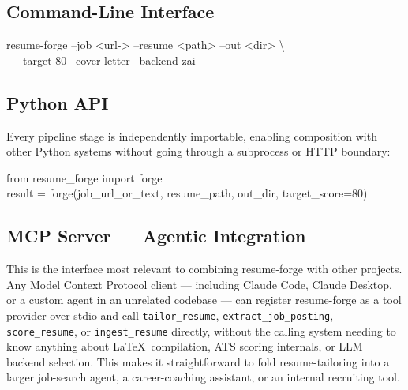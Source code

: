 \documentclass[10.5pt,letterpaper]{article}
\begin{document}
\subsection{Command-Line Interface}
\begin{center}
\begin{tcolorbox}[colback=brandIndigoDark, colframe=brandIndigoDark, arc=2pt,
  left=8pt,right=8pt,top=6pt,bottom=6pt, width=0.92\textwidth]
\ttfamily\footnotesize\color{white}
resume-forge --job <url\textbar-> --resume <path> --out <dir> \textbackslash \\
\ \ --target 80 --cover-letter --backend zai
\end{tcolorbox}
\end{center}

\subsection{Python API}
Every pipeline stage is independently importable, enabling composition with other Python
systems without going through a subprocess or HTTP boundary:
\begin{center}
\begin{tcolorbox}[colback=brandIndigoDark, colframe=brandIndigoDark, arc=2pt,
  left=8pt,right=8pt,top=6pt,bottom=6pt, width=0.92\textwidth]
\ttfamily\footnotesize\color{white}
from resume\_forge import forge\\
result = forge(job\_url\_or\_text, resume\_path, out\_dir, target\_score=80)
\end{tcolorbox}
\end{center}

\subsection{MCP Server --- Agentic Integration}
This is the interface most relevant to combining resume-forge with other projects. Any
Model Context Protocol client --- including Claude Code, Claude Desktop, or a custom agent
in an unrelated codebase --- can register resume-forge as a tool provider over stdio and
call \texttt{tailor\_resume}, \texttt{extract\_job\_posting}, \texttt{score\_resume}, or
\texttt{ingest\_resume} directly, without the calling system needing to know anything about
\LaTeX\ compilation, ATS scoring internals, or LLM backend selection. This makes it
straightforward to fold resume-tailoring into a larger job-search agent, a career-coaching
assistant, or an internal recruiting tool.
\end{document}

